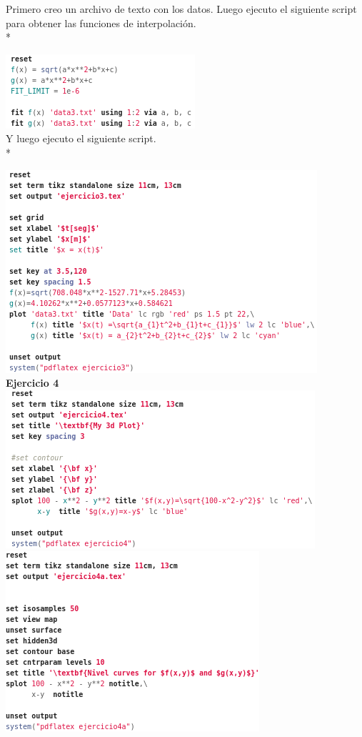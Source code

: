 \documentclass[11.5pt,a4paper]{article}
\begin{document}
Primero creo un archivo de texto con los datos. Luego ejecuto el siguiente script para obtener las funciones de interpolación.\\*

\includegraphics[scale=0.75]{screen15.png}\\

Y luego ejecuto el siguiente script.\\*

\includegraphics[scale=0.75]{screen16.png}\\

\textbf{Ejercicio 4}\\

\includegraphics[scale=0.65]{screen17.png}
\includegraphics[scale=0.65]{screen18.png}
\end{document}
